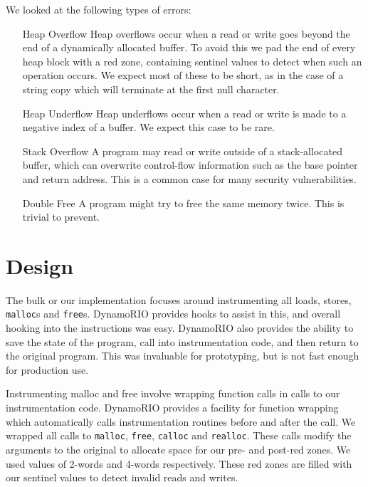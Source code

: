 \documentclass{article}
\newcommand{\code}[1]{\texttt{#1}}
\begin{document}
We looked at the following types of errors:
\begin{enumerate}
    \item[Heap Overflow] Heap overflows occur when a read or write goes beyond the end of a dynamically allocated buffer.  To avoid this we pad the end of every heap block with a red zone, containing sentinel values to detect when such an operation occurs.  We expect most of these to be short, as in the case of a string copy which will terminate at the first null character.
    \item[Heap Underflow] Heap underflows occur when a read or write is made to a negative index of a buffer.  We expect this case to be rare.
    \item[Stack Overflow] A program may read or write outside of a stack-allocated buffer, which can overwrite control-flow information such as the base pointer and return address.  This is a common case for many security vulnerabilities.
    \item[Double Free] A program might try to free the same memory twice.  This is trivial to prevent.
\end{enumerate}


\section{Design} %
\label{sec:Design}
The bulk or our implementation focuses around instrumenting all loads, stores, \code{malloc}s and \code{free}s.  DynamoRIO provides hooks to assist in this, and overall hooking into the instructions was easy.  DynamoRIO also provides the ability to save the state of the program, call into instrumentation code, and then return to the original program.  This was invaluable for prototyping, but is not fast enough for production use.

Instrumenting malloc and free involve wrapping function calls in calls to our instrumentation code.  DynamoRIO provides a facility for function wrapping which automatically calls instrumentation routines before and after the call.  We wrapped all calls to \code{malloc}, \code{free}, \code{calloc} and \code{realloc}.  These calls modify the arguments to the original to allocate space for our pre- and post-red zones.  We used values of 2-words and 4-words respectively.  These red zones are filled with our sentinel values to detect invalid reads and writes.
\end{document}
